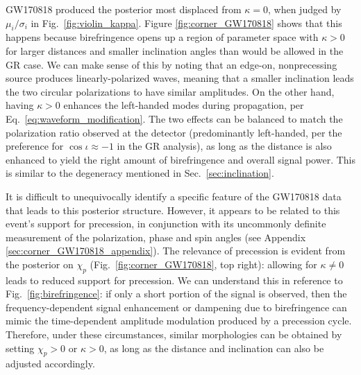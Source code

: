 \documentclass[aps,prd,twocolumn,superscriptaddress,preprintnumbers,floatfix,nofootinbib]{revtex4-2}
\begin{document}
GW170818 produced the posterior most displaced from $\kappa=0$, when judged by $\mu_i/\sigma_i$ in Fig.~\ref{fig:violin_kappa}.
Figure \ref{fig:corner_GW170818} shows that this happens because birefringence opens up a region of parameter space with $\kappa>0$ for larger distances and smaller inclination angles than would be allowed in the GR case.
We can make sense of this by noting that an edge-on, nonprecessing source produces linearly-polarized waves, meaning that a smaller inclination leads the two circular polarizations to have similar amplitudes.
On the other hand, having $\kappa > 0$ enhances the left-handed modes during propagation, per Eq.~\eqref{eq:waveform_modification}.
The two effects can be balanced to match the polarization ratio observed at the detector (predominantly left-handed, per the preference for $\cos\iota \approx -1$ in the \ac{GR} analysis), as long as the distance is also enhanced to yield the right amount of birefringence and overall signal power.
This is similar to the degeneracy mentioned in Sec.~\ref{sec:inclination}.

It is difficult to unequivocally identify a specific feature of the GW170818 data that leads to this posterior structure.
However, it appears to be related to this event's support for precession, in conjunction with its uncommonly definite measurement of the polarization, phase and spin angles \cite{Varma:2021csh} (see Appendix \ref{sec:corner_GW170818_appendix}).
The relevance of precession is evident from the posterior on $\chi_p$ (Fig.~\ref{fig:corner_GW170818}, top right): allowing for $\kappa \neq 0$ leads to reduced support for precession.
We can understand this in reference to Fig.~\ref{fig:birefringence}: if only a short portion of the signal is observed, then the frequency-dependent signal enhancement or dampening due to birefringence can mimic the time-dependent amplitude modulation produced by a precession cycle.
Therefore, under these circumstances, similar morphologies can be obtained by setting $\chi_p > 0$ or $\kappa > 0$, as long as the distance and inclination can also be adjusted accordingly.
\end{document}
